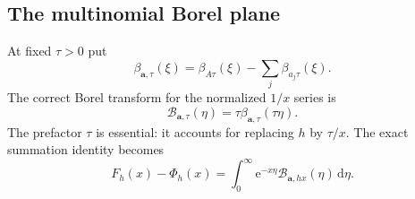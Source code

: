 \documentclass[11pt,a4paper]{article}
\numberwithin{equation}{section}
\theoremstyle{definition}\newtheorem{definition}[theorem]{Definition}
\theoremstyle{remark}\newtheorem{remark}[theorem]{Remark}
\newcommand{\e}{\mathrm e}
\newcommand{\dd}{\,\mathrm d}
\newcommand{\avec}{\boldsymbol a}
\newcommand{\calB}{\mathscr B}
\begin{document}
\subsection{The multinomial Borel plane}
At fixed $\tau>0$ put
\begin{equation}
 \beta_{\avec,\tau}(\xi)=\beta_{A\tau}(\xi)-\sum_j\beta_{a_j\tau}(\xi).
 \label{eq:beta-multi}
\end{equation}
The correct Borel transform for the normalized $1/x$ series is
\begin{equation}
 \calB_{\avec,\tau}(\eta)=\tau\beta_{\avec,\tau}(\tau\eta).
 \label{eq:scaled-Borel}
\end{equation}
The prefactor $\tau$ is essential: it accounts for replacing $h$ by $\tau/x$.
The exact summation identity becomes
\begin{equation}
 F_h(x)-\Phi_h(x)=\int_0^\infty\e^{-x\eta}
                              \calB_{\avec,hx}(\eta)\dd\eta.
 \label{eq:scaled-Laplace}
\end{equation}
\end{document}
